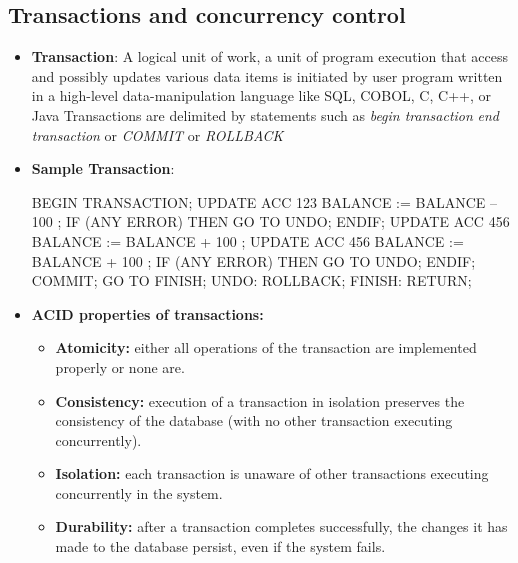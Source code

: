 \documentclass{report}
\begin{document}
    \subsection{Transactions and concurrency control}
    \begin{itemize}
        \item \textbf{Transaction}: A logical unit of work, a unit of program execution that access and possibly updates various data items
            \bigbreak \noindent 
            is initiated by user program written in a high-level data-manipulation language like  SQL, COBOL, C, C++, or Java
            \bigbreak \noindent 
            Transactions are delimited by statements such as \textit{begin transaction} \textit{end transaction} or \textit{COMMIT} or \textit{ROLLBACK}
        \item \textbf{Sample Transaction}: 
            \bigbreak \noindent 
            \begin{cppcode}
                BEGIN TRANSACTION;
                    UPDATE ACC 123 { BALANCE := BALANCE – 100 };
                    IF (ANY ERROR) THEN
                        GO TO UNDO;
                    ENDIF;
                    UPDATE ACC 456 { BALANCE := BALANCE + 100 };
                    UPDATE ACC 456 { BALANCE := BALANCE + 100 };
                    IF (ANY ERROR) THEN
                        GO TO UNDO;
                    ENDIF;
                    COMMIT;
                    GO TO FINISH;
                UNDO:
                    ROLLBACK;
                FINISH:
                    RETURN;
            \end{cppcode}
        \item \textbf{ACID properties of transactions:}
            \begin{itemize}
                \item \textbf{Atomicity:} either all operations of the transaction are implemented properly or none are.
                \item \textbf{Consistency:} execution of a transaction in isolation preserves the consistency of the database (with no other transaction executing concurrently).
                \item \textbf{Isolation:} each transaction is unaware of other transactions executing concurrently in the system.
                \item \textbf{Durability:} after a transaction completes successfully, the changes it has made to the database persist, even if the system fails.
            \end{itemize}

\end{itemize}
\end{document}
